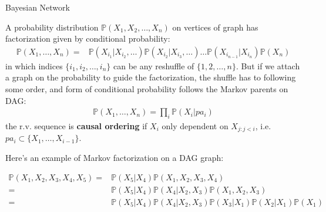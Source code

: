 \begin{point}
    Bayesian Network
\end{point}

A probability distribution $ \mathbb{P}\left( X_1,X_2,\ldots,X_n \right) $ on vertices of graph has factorization given by conditional probability:
\begin{align*}
    \mathbb{P}\left( X_1,\ldots,X_n \right) = &\mathbb{P}\left( X_{i_1}|X_{i_2},\ldots \right)\mathbb{P}\left( X_{i_2}|X_{i_3},\ldots \right)\ldots\mathbb{P}\left( X_{i_{n-1}}|X_{i_n} \right) \mathbb{P}\left( X_n \right)    
\end{align*}
in which indices $ \{i_1,i_2,\ldots,i_n\} $ can be any reshuffle of $ \{1,2,\ldots,n\} $. But if we attach a graph on the probability to guide the factorization, the shuffle has to following some order, and form of conditional probability follows the Markov parents on DAG:
\begin{align*}
    \mathbb{P}\left( X_1,\ldots,X_n \right)=\prod_{i}\mathbb{P}\left( X_i|pa_i \right)
\end{align*}
the r.v. sequence is \textbf{causal ordering} if $ X_i $ only dependent on $ X_{j:j<i} $, i.e. $ pa_i\subset \{X_1,\ldots,X_{i-1}\} $.

Here's an example of Markov factorization on a DAG graph:




    \begin{center}
    \begin{minipage}{0.7\linewidth}
        \begin{align*}
            \mathbb{P}\left( X_1,X_2,X_3,X_4,X_5 \right) = & \mathbb{P}\left( X_5|X_4 \right) \mathbb{P}\left( X_1,X_2,X_3,X_4 \right) \\
            =&\mathbb{P}\left( X_5|X_4 \right) \mathbb{P}\left( X_4|X_2,X_3 \right) \mathbb{P}\left( X_1,X_2,X_3 \right) \\
            =&\mathbb{P}\left( X_5|X_4 \right) \mathbb{P}\left( X_4|X_2,X_3 \right) \mathbb{P}\left( X_3|X_1 \right) \mathbb{P}\left( X_2|X_1 \right) \mathbb{P}\left( X_1 \right)  \quad\,       
        \end{align*}
    \end{minipage}
    \end{center}

